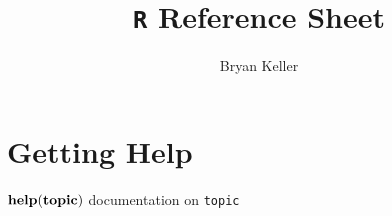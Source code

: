 \documentclass{article}
\title{\texttt{R} Reference Sheet}
\author{Bryan Keller}
\newcommand{\fn}[1]{\textbf{\texttt{$\bf#1$}}}
\begin{document}
\section{Getting Help}
\fn{help(topic)} documentation on \texttt{topic} \\
\end{document}
